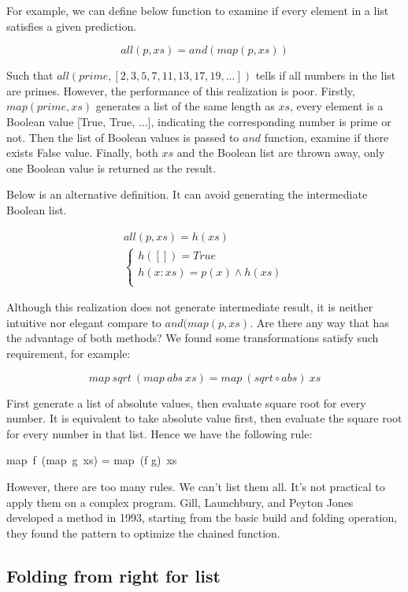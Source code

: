 \documentclass{article}
\begin{document}
For example, we can define below function to examine if every element in a list satisfies a given prediction\cite{GLPJ-1993}.

\[
all(p, xs) = and(map(p, xs))
\]

Such that $all(prime, [2, 3, 5, 7, 11, 13, 17, 19, ...])$ tells if all numbers in the list are primes. However, the performance of this realization is poor. Firstly, $map(prime, xs)$ generates a list of the same length as $xs$, every element is a Boolean value [True, True, ...], indicating the corresponding number is prime or not. Then the list of Boolean values is passed to $and$ function, examine if there exists False value. Finally, both $xs$ and the Boolean list are thrown away, only one Boolean value is returned as the result.

Below is an alternative definition. It can avoid generating the intermediate Boolean list.

\[
\begin{array}{l}
all(p, xs) = h(xs) \\
  \begin{cases}
  h([]) = True \\
  h(x:xs) = p(x) \land h(xs) \\
  \end{cases}
\end{array}
\]

Although this realization does not generate intermediate result, it is neither intuitive nor elegant compare to $and(map(p, xs)$. Are there any way that has the advantage of both methods? We found some transformations satisfy such requirement, for example:

\[
map\ sqrt\  (map\ abs\ xs) = map\ (sqrt \circ abs)\ xs
\]

First generate a list of absolute values, then evaluate square root for every number. It is equivalent to take absolute value first, then evaluate the square root for every number in that list. Hence we have the following rule:

\be
map\ f\ (map\ g\ xs) = map\ (f \circ g)\ xs
\ee

However, there are too many rules. We can't list them all. It's not practical to apply them on a complex program. Gill, Launchbury, and Peyton Jones developed a method in 1993, starting from the basic build and folding operation, they found the pattern to optimize the chained function.

\subsection{Folding from right for list}
\end{document}
